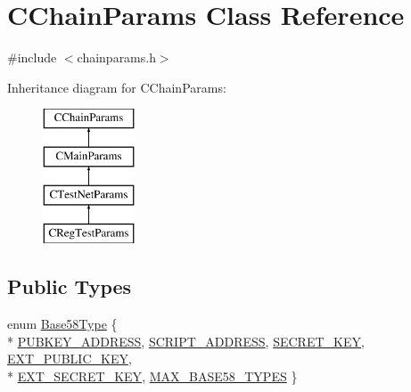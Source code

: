 \hypertarget{class_c_chain_params}{}\section{C\+Chain\+Params Class Reference}
\label{class_c_chain_params}


{\ttfamily \#include $<$chainparams.\+h$>$}

Inheritance diagram for C\+Chain\+Params\+:\begin{figure}[H]
\begin{center}
\leavevmode
\includegraphics[height=4.000000cm]{class_c_chain_params}
\end{center}
\end{figure}
\subsection*{Public Types}
\begin{DoxyCompactItemize}
\item 
enum \hyperlink{class_c_chain_params_aa294058ec2e3586bd8d03d6c39667058}{Base58\+Type} \{ \\*
\hyperlink{class_c_chain_params_aa294058ec2e3586bd8d03d6c39667058af088724f20c49c73e548f94d8f1808dd}{P\+U\+B\+K\+E\+Y\+\_\+\+A\+D\+D\+R\+E\+S\+S}, 
\hyperlink{class_c_chain_params_aa294058ec2e3586bd8d03d6c39667058adf0172df56140eb2f6fb7a59df0bb76a}{S\+C\+R\+I\+P\+T\+\_\+\+A\+D\+D\+R\+E\+S\+S}, 
\hyperlink{class_c_chain_params_aa294058ec2e3586bd8d03d6c39667058aacf95cbb9b5f51445295c704540adb18}{S\+E\+C\+R\+E\+T\+\_\+\+K\+E\+Y}, 
\hyperlink{class_c_chain_params_aa294058ec2e3586bd8d03d6c39667058a1259eb07831c689e393e5008d7bd0085}{E\+X\+T\+\_\+\+P\+U\+B\+L\+I\+C\+\_\+\+K\+E\+Y}, 
\\*
\hyperlink{class_c_chain_params_aa294058ec2e3586bd8d03d6c39667058ab5636e60152f35f6595fe413eae430b0}{E\+X\+T\+\_\+\+S\+E\+C\+R\+E\+T\+\_\+\+K\+E\+Y}, 
\hyperlink{class_c_chain_params_aa294058ec2e3586bd8d03d6c39667058a6b21a525c7fab64a5df656e708f71a98}{M\+A\+X\+\_\+\+B\+A\+S\+E58\+\_\+\+T\+Y\+P\+E\+S}
 \}
\end{DoxyCompactItemize}
